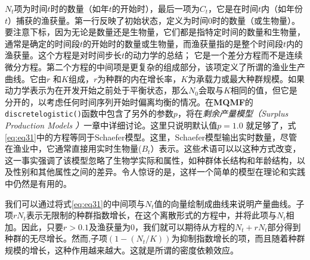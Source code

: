 \documentclass[
  lang=cn,
  11pt,
  scheme=chinese,
  chinesefont=nofont,
  citestyle=gb7714-2015,
  bibstyle=gb7714-2015]{elegantbook}
\begin{document}
\(N_t\)项为时间\(t\)时的数量（如年\(t\)的开始时），最后一项为\(C_t\)，它是在时间\(t\)内（如年份\(t\)）捕获的渔获量。第一行反映了初始状态，定义为时间0时的数量（或生物量）。要注意下标，因为无论是数量还是生物量，它们都是指特定时间的数量和生物量，通常是确定的时间段\(t\)的开始时的数量或生物量，而渔获量指的是整个时间段\(t\)内的渔获量。这个方程是对时间步长\(t\)的动力学的总结； 它是一个差分方程而不是连续微分方程。第二个方程的中间项是更复杂的组成部分，该项定义了所谓的渔业生产曲线。它由\(r\) 和\(K\)组成，\(r\)为种群的内在增长率，\(K\)为承载力或最大种群规模。如果动力学表示为在开发开始之前处于平衡状态，那么\(N_0\)会取与\(K\)相同的值，但它是分开的，以考虑任何时间序列开始时偏离均衡的情况。在\textbf{MQMF}的\texttt{discretelogistic()}函数中包含了另外的参数\(p\)，将在\emph{剩余产量模型（Surplus Production Models ）}一章中详细讨论。这里只说明默认值\(p=1.0\) 就足够了，式\eqref{eq:eq31}中的方程等同于Schaefer模型。这里，Schaefer模型输出实时数量，尽管在渔业中，它通常直接用实时生物量(\(B_t\)）表示。这些术语可以以这种方式改变，这一事实强调了该模型忽略了生物学实际和属性，如种群体长结构和年龄结构，以及性别和其他属性之间的差异。令人惊讶的是，这样一个简单的模型在理论和实践中仍然是有用的。

我们可以通过将式\eqref{eq:eq31}的中间项与\(N_t\)值的向量绘制成曲线来说明产量曲线。子项\(rN_t\)表示无限制的种群指数增长，在这个离散形式的方程中，并将此项与\(N_t\)相加。因此，只要\(r>0.1\)及渔获量为0，我们就可以期待从方程的\(N_t+rN_t\)部分得到种群的无尽增长。然而,子项\((1−(N_t/K))\)为抑制指数增长的项，而且随着种群规模的增长，这种作用越来越大。这就是所谓的密度依赖效应。
\end{document}
